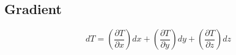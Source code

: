 \subsection{Gradient}

\begin{equation}
    dT = \left( \frac{\partial T}{\partial x} \right) dx + \left( \frac{\partial T}{\partial y} \right) dy + \left( \frac{\partial T}{\partial z} \right) dz
\end{equation}